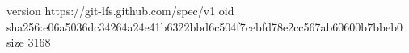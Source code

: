 version https://git-lfs.github.com/spec/v1
oid sha256:e06a5036dc34264a24e41b6322bbd6c504f7cebfd78e2cc567ab60600b7bbeb0
size 3168
